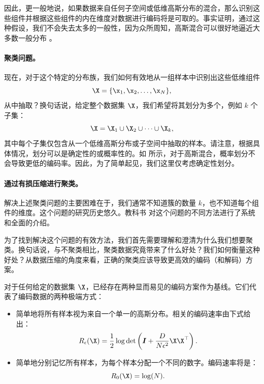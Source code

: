 \documentclass[../../book-main.tex]{subfiles}
\begin{document}
因此，更一般地说，如果数据来自任何子空间或低维高斯分布的混合，那么识别这些组件并根据这些组件的内在维度对数据进行编码将是可取的。事实证明，通过这种假设，我们不会失去太多的一般性，因为众所周知，高斯混合可以很好地逼近大多数一般分布 \cite{borkar2016gaussian}。

\paragraph{聚类问题。}
现在，对于这个特定的分布族，我们如何有效地从一组样本中识别出这些低维组件
\begin{equation}
    \X = \{\x_1, \x_2, \ldots, \x_N\},
\end{equation}
从中抽取？换句话说，给定整个数据集 $\X$，我们希望将其划分为多个，例如 $k$ 个子集：
\begin{equation}
    \X = \X_1 \cup \X_2 \cup \cdots \cup \X_k,
\end{equation}
其中每个子集仅包含从一个低维高斯分布或子空间中抽取的样本。请注意，根据具体情况，划分可以是确定性的或概率性的。如 \cite{ma2007segmentation} 所示，对于高斯混合，概率划分不会导致更低的编码率。因此，为了简单起见，我们这里仅考虑确定性划分。

\paragraph{通过有损压缩进行聚类。}
解决上述聚类问题的主要困难在于，我们通常不知道簇的数量 $k$，也不知道每个组件的维度。这个问题的研究历史悠久。教科书 \cite{GPCA} 对这个问题的不同方法进行了系统和全面的介绍。

为了找到解决这个问题的有效方法，我们首先需要理解和澄清为什么我们想要聚类。换句话说，与不聚类相比，聚类数据究竟带来了什么好处？我们如何衡量这种好处？从数据压缩的角度来看，正确的聚类应该导致更高效的编码（和解码）方案。

对于任何给定的数据集 $\X$，已经存在两种显而易见的编码方案作为基线。它们代表了编码数据的两种极端方式：
\begin{itemize}
\item 简单地将所有样本视为来自一个单一的高斯分布。相关的编码速率由下式给出：
\begin{equation}
    R_{\epsilon}(\X) = \frac{1}{2} \log \det \left(\boldsymbol{I} + \frac{D}{N\epsilon^2} \X\X^\top \right).
\end{equation}
\item 简单地分别记忆所有样本，为每个样本分配一个不同的数字。编码速率将是：
\begin{equation}
    R_0(\X) = \log(N). 
\end{equation}
\end{itemize}
\end{document}
